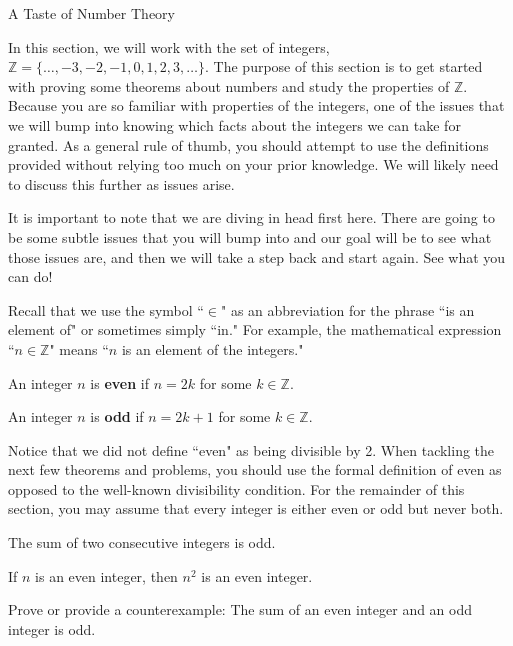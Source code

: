 \begin{section}{A Taste of Number Theory}

In this section, we will work with the set of integers, $\mathbb{Z} = \{\ldots, -3, -2, -1, 0, 1, 2, 3, \ldots\}$.  The purpose of this section is to get started with proving some theorems about numbers and study the properties of $\mathbb{Z}$. Because you are so familiar with properties of the integers, one of the issues that we will bump into knowing which facts about the integers we can take for granted.  As a general rule of thumb, you should attempt to use the definitions provided without relying too much on your prior knowledge.  We will likely need to discuss this further as issues arise.

It is important to note that we are diving in head first here.  There are going to be some subtle issues that you will bump into and our goal will be to see what those issues are, and then we will take a step back and start again.  See what you can do!

Recall that we use the symbol ``$\in$" as an abbreviation for the phrase ``is an element of" or sometimes simply ``in."  For example, the mathematical expression ``$n\in\mathbb{Z}$" means ``$n$ is an element of the integers."

\begin{definition}
An integer $n$ is \textbf{even} if $n=2k$ for some $k\in\mathbb{Z}$.
\end{definition}

\begin{definition}
An integer $n$ is \textbf{odd} if $n=2k+1$ for some $k\in\mathbb{Z}$.
\end{definition}

Notice that we did not define ``even" as being divisible by 2.  When tackling the next few theorems and problems, you should use the formal definition of even as opposed to the well-known divisibility condition.  For the remainder of this section, you may assume that every integer is either even or odd but never both.

\begin{theorem}\label{two consecutive ints}
The sum of two consecutive integers is odd.
\end{theorem}

\begin{theorem}
If $n$ is an even integer, then $n^2$ is an even integer.
\end{theorem}

\begin{problem}\label{prob:sum of even and odd}
Prove or provide a counterexample:  The sum of an even integer and an odd integer is odd.
\end{problem}


\end{section}
